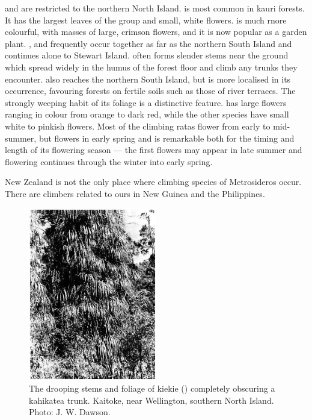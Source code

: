  and  are restricted to the northern North Island.  is most common in kauri forests.
It has the largest leaves of the group and small, white flowers.  is much rnore colourful, with masses of large, crimson flowers, and it is now popular as a garden plant. ,  and  frequently occur together as far as the northern South Island and  continues alone to Stewart Island.  often forms slender stems near the ground which spread widely in the humus of the forest floor and climb any trunks they encounter.  also reaches the northern South Island, but is more localised in its occurrence, favouring forests on fertile soils such as those of river terraces.
The strongly weeping habit of its foliage is a distinctive feature.  has large flowers ranging in colour from orange to dark red, while the other species have small white to pinkish flowers.
Most of the climbing ratas flower from early to mid-summer, but  flowers in early spring and  is remarkable both for the timing and length of its flowering season — the first flowers may appear in late summer and flowering continues through the winter into early spring.

New Zealand is not the only place where climbing species of Metrosideros occur.
There are climbers related to ours in New Guinea and the Philippines.

\begin{figure}
	\includegraphics[width=0.5\textwidth]{graphics/figure32kiekie.jpg}
	\centering
	\caption[The drooping stems and foliage of kiekie]{The drooping stems and foliage of kiekie () completely obscuring a kahikatea trunk. Kaitoke, near Wellington, southern North Island. Photo: J. W. Dawson.}
	\label{fig:32kiekie}
\end{figure}

